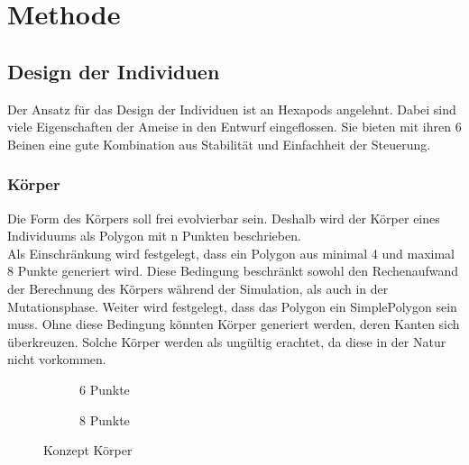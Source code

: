 %
%


\chapter{Methode}

  \section{Design der Individuen}

    Der Ansatz für das Design der Individuen ist an \Glspl{Hexapod} angelehnt.
    Dabei sind viele Eigenschaften der Ameise in den Entwurf eingeflossen.
    Sie bieten mit ihren 6 Beinen eine gute Kombination aus Stabilität und Einfachheit der Steuerung.

    \subsection{Körper\label{sub:DesignBody}}

      Die Form des Körpers soll frei evolvierbar sein.
      Deshalb wird der Körper eines Individuums als Polygon mit n Punkten beschrieben.
      \\
      Als Einschränkung wird festgelegt, dass ein Polygon aus minimal 4 und maximal 8 Punkte generiert wird.
      Diese Bedingung beschränkt sowohl den Rechenaufwand der Berechnung des Körpers während der Simulation,
      als auch in der Mutationsphase.
      Weiter wird festgelegt, dass das Polygon ein \gls{SimplePolygon} sein muss.
      Ohne diese Bedingung könnten Körper generiert werden, deren Kanten sich überkreuzen.
      Solche Körper werden als ungültig erachtet, da diese in der Natur nicht vorkommen.

      \begin{figure}[H]
        \centering
        \begin{subfigure}[b]{0.3\textwidth}
          
          \caption{6 Punkte\label{fig:ConceptBodyPoints6}}
        \end{subfigure}
        \qquad
        \begin{subfigure}[b]{0.3\textwidth}
          
          \caption{8 Punkte\label{fig:ConceptBodyPoints8}}
        \end{subfigure}
        \caption{Konzept Körper\label{fig:ConceptBodyPoints}}
      \end{figure}

